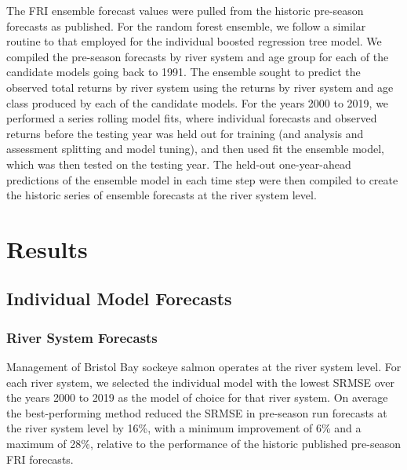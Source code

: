 \documentclass[
]{article}
\begin{document}
The FRI ensemble forecast values were pulled from the historic pre-season forecasts as published. For the random forest ensemble, we follow a similar routine to that employed for the individual boosted regression tree model. We compiled the pre-season forecasts by river system and age group for each of the candidate models going back to 1991. The ensemble sought to predict the observed total returns by river system using the returns by river system and age class produced by each of the candidate models. For the years 2000 to 2019, we performed a series rolling model fits, where individual forecasts and observed returns before the testing year was held out for training (and analysis and assessment splitting and model tuning), and then used fit the ensemble model, which was then tested on the testing year. The held-out one-year-ahead predictions of the ensemble model in each time step were then compiled to create the historic series of ensemble forecasts at the river system level.

\hypertarget{results}{%
\section*{Results}\label{results}}

\hypertarget{individual-model-forecasts}{%
\subsection*{Individual Model Forecasts}\label{individual-model-forecasts}}

\hypertarget{river-system-forecasts}{%
\subsubsection*{River System Forecasts}\label{river-system-forecasts}}

Management of Bristol Bay sockeye salmon operates at the river system level. For each river system, we selected the individual model with the lowest SRMSE over the years 2000 to 2019 as the model of choice for that river system. On average the best-performing method reduced the SRMSE in pre-season run forecasts at the river system level by 16\%, with a minimum improvement of 6\% and a maximum of 28\%, relative to the performance of the historic published pre-season FRI forecasts.
\end{document}
